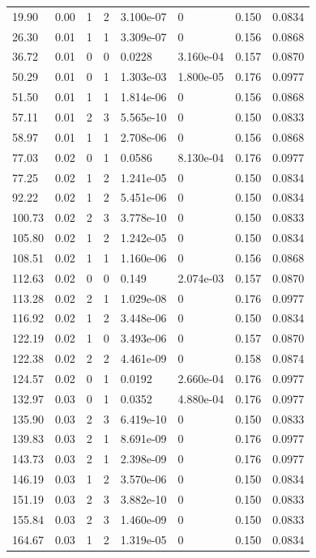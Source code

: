 \documentclass[preview]{standalone}
\begin{document}
{{\begin{tabular}{L{1.2cm}C{1.2cm} C{0.3cm}C{0.5cm} C{1.4cm}C{1.4cm} C{1.4cm}C{1.4cm}}
  19.90  &  0.00  & 1     &  2 &  3.100e-07  & 0  & 0.150 &  0.0834   \\ 
  26.30  &  0.01  & 1     &  1 &  3.309e-07  & 0  & 0.156 &  0.0868   \\ 
  36.72  &  0.01  & 0     &  0 &  0.0228  & 3.160e-04  & 0.157 &  0.0870   \\ 
  50.29  &  0.01  & 0     &  1 &  1.303e-03  & 1.800e-05  & 0.176 &  0.0977   \\ 
  51.50  &  0.01  & 1     &  1 &  1.814e-06  & 0  & 0.156 &  0.0868   \\ 
  57.11  &  0.01  & 2     &  3 &  5.565e-10  & 0  & 0.150 &  0.0833   \\ 
  58.97  &  0.01  & 1     &  1 &  2.708e-06  & 0  & 0.156 &  0.0868   \\ 
  77.03  &  0.02  & 0     &  1 &  0.0586  & 8.130e-04  & 0.176 &  0.0977   \\ 
  77.25  &  0.02  & 1     &  2 &  1.241e-05  & 0  & 0.150 &  0.0834   \\ 
  92.22  &  0.02  & 1     &  2 &  5.451e-06  & 0  & 0.150 &  0.0834   \\ 
  100.73  &  0.02  & 2     &  3 &  3.778e-10  & 0  & 0.150 &  0.0833   \\ 
  105.80  &  0.02  & 1     &  2 &  1.242e-05  & 0  & 0.150 &  0.0834   \\ 
  108.51  &  0.02  & 1     &  1 &  1.160e-06  & 0  & 0.156 &  0.0868   \\ 
  112.63  &  0.02  & 0     &  0 &  0.149  & 2.074e-03  & 0.157 &  0.0870   \\ 
  113.28  &  0.02  & 2     &  1 &  1.029e-08  & 0  & 0.176 &  0.0977   \\ 
  116.92  &  0.02  & 1     &  2 &  3.448e-06  & 0  & 0.150 &  0.0834   \\ 
  122.19  &  0.02  & 1     &  0 &  3.493e-06  & 0  & 0.157 &  0.0870   \\ 
  122.38  &  0.02  & 2     &  2 &  4.461e-09  & 0  & 0.158 &  0.0874   \\ 
  124.57  &  0.02  & 0     &  1 &  0.0192  & 2.660e-04  & 0.176 &  0.0977   \\ 
  132.97  &  0.03  & 0     &  1 &  0.0352  & 4.880e-04  & 0.176 &  0.0977   \\ 
  135.90  &  0.03  & 2     &  3 &  6.419e-10  & 0  & 0.150 &  0.0833   \\ 
  139.83  &  0.03  & 2     &  1 &  8.691e-09  & 0  & 0.176 &  0.0977   \\ 
  143.73  &  0.03  & 2     &  1 &  2.398e-09  & 0  & 0.176 &  0.0977   \\ 
  146.19  &  0.03  & 1     &  2 &  3.570e-06  & 0  & 0.150 &  0.0834   \\ 
  151.19  &  0.03  & 2     &  3 &  3.882e-10  & 0  & 0.150 &  0.0833   \\ 
  155.84  &  0.03  & 2     &  3 &  1.460e-09  & 0  & 0.150 &  0.0833   \\ 
  164.67  &  0.03  & 1     &  2 &  1.319e-05  & 0  & 0.150 &  0.0834   \\ 
\hline 
\end{tabular} 

}}
\end{document}
